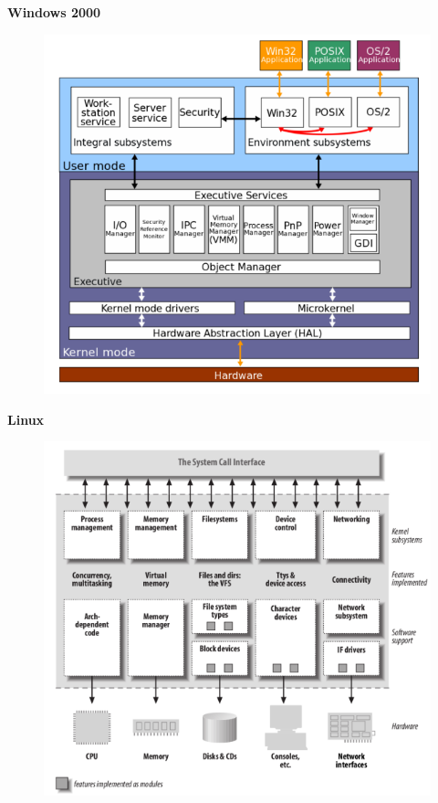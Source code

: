 \documentclass{article}
\begin{document}
\textbf{Windows 2000}
\begin{figure}[h]
\centering
\includegraphics[scale=1,width=\textwidth]{WINDOWS2000.png}
\end{figure}

\newpage

\textbf{Linux}
\begin{figure}[h]
\centering
\includegraphics[scale=1,width=\textwidth]{linux.png}
\end{figure}
\end{document}
